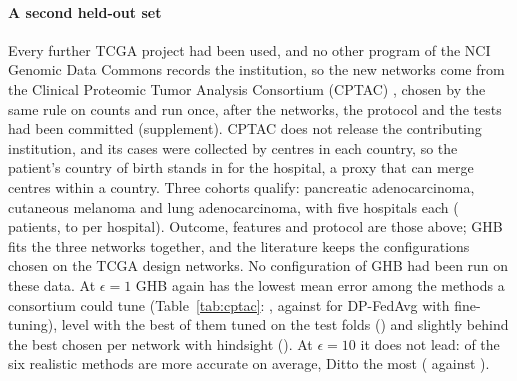 \paragraph{A second held-out set} Every further TCGA project had been used, and no other program of the NCI Genomic Data Commons records the institution, so the new networks come from the Clinical Proteomic Tumor Analysis Consortium (CPTAC) \cite{edwards2015cptac}, chosen by the same rule on counts and run once, after the networks, the protocol and the tests had been committed (supplement). CPTAC does not release the contributing institution, and its cases were collected by centres in each country, so the patient's country of birth stands in for the hospital, a proxy that can merge centres within a country. Three cohorts qualify: pancreatic adenocarcinoma, cutaneous melanoma and lung adenocarcinoma, with five hospitals each (\SimCpPatients{} patients, \SimCpMinN{} to \SimCpMaxN{} per hospital). Outcome, features and protocol are those above; GHB fits the three networks together, and the literature keeps the configurations chosen on the TCGA design networks. No configuration of GHB had been run on these data. At $\epsilon=1$ GHB again has the lowest mean error among the methods a consortium could tune (Table~\ref{tab:cptac}: \SimCpOneGHB, against \SimCpOneBestReal{} for DP-FedAvg \cite{mcmahan2018learning} with fine-tuning), level with the best of them tuned on the test folds (\SimCpOneBestOrc) and slightly behind the best chosen per network with hindsight (\SimCpOneNetOrc). At $\epsilon=10$ it does not lead: \SimCpTenRealAhead{} of the six realistic methods are more accurate on average, Ditto \cite{li2021ditto} the most (\SimCpTenBestReal{} against \SimCpTenGHB).

\begin{table}[t]
\caption{Three CPTAC networks, a second held-out set (five hospitals each; the hospital is the patient's country of birth): held-out log-loss relative to local estimation, as in Table~\ref{tab:tcga-confirm}, with the literature's configurations from the TCGA design networks. Bold: the lowest per network among methods that use other hospitals, oracle excluded. Wins: networks in which GHB is more accurate. $\ddagger$: no other hospital. $\star$: best configuration of the best of the six methods on each network's own held-out folds.}
\label{tab:cptac}
\scriptsize
\setlength{\tabcolsep}{4pt}
\end{table}

